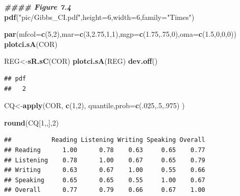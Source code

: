 \documentclass[12pt]{article}
\newenvironment{Shaded}{\begin{snugshade}}{\end{snugshade}}
\newcommand{\AttributeTok}[1]{\textcolor[rgb]{0.13,0.29,0.53}{#1}}
\newcommand{\DecValTok}[1]{\textcolor[rgb]{0.00,0.00,0.81}{#1}}
\newcommand{\DocumentationTok}[1]{\textcolor[rgb]{0.56,0.35,0.01}{\textbf{\textit{#1}}}}
\newcommand{\FloatTok}[1]{\textcolor[rgb]{0.00,0.00,0.81}{#1}}
\newcommand{\FunctionTok}[1]{\textcolor[rgb]{0.13,0.29,0.53}{\textbf{#1}}}
\newcommand{\NormalTok}[1]{#1}
\newcommand{\OtherTok}[1]{\textcolor[rgb]{0.56,0.35,0.01}{#1}}
\newcommand{\StringTok}[1]{\textcolor[rgb]{0.31,0.60,0.02}{#1}}
\begin{document}
\begin{Shaded}
\begin{Highlighting}[]
\DocumentationTok{\#\#\#\# Figure 7.4 }
\FunctionTok{pdf}\NormalTok{(}\StringTok{"pic/Gibbs\_CI.pdf"}\NormalTok{,}\AttributeTok{height=}\DecValTok{6}\NormalTok{,}\AttributeTok{width=}\DecValTok{6}\NormalTok{,}\AttributeTok{family=}\StringTok{"Times"}\NormalTok{)}

\FunctionTok{par}\NormalTok{(}\AttributeTok{mfcol=}\FunctionTok{c}\NormalTok{(}\DecValTok{5}\NormalTok{,}\DecValTok{2}\NormalTok{),}\AttributeTok{mar=}\FunctionTok{c}\NormalTok{(}\DecValTok{3}\NormalTok{,}\FloatTok{2.75}\NormalTok{,}\DecValTok{1}\NormalTok{,}\DecValTok{1}\NormalTok{),}\AttributeTok{mgp=}\FunctionTok{c}\NormalTok{(}\FloatTok{1.75}\NormalTok{,.}\DecValTok{75}\NormalTok{,}\DecValTok{0}\NormalTok{),}\AttributeTok{oma=}\FunctionTok{c}\NormalTok{(}\FloatTok{1.5}\NormalTok{,}\DecValTok{0}\NormalTok{,}\DecValTok{0}\NormalTok{,}\DecValTok{0}\NormalTok{))}
\FunctionTok{plotci.sA}\NormalTok{(COR)}

\NormalTok{REG}\OtherTok{\textless{}{-}}\FunctionTok{sR.sC}\NormalTok{(COR)}
\FunctionTok{plotci.sA}\NormalTok{(REG)}
\FunctionTok{dev.off}\NormalTok{()}
\end{Highlighting}
\end{Shaded}

\begin{verbatim}
## pdf 
##   2
\end{verbatim}

\begin{Shaded}
\begin{Highlighting}[]
\NormalTok{CQ}\OtherTok{\textless{}{-}}\FunctionTok{apply}\NormalTok{(COR, }\FunctionTok{c}\NormalTok{(}\DecValTok{1}\NormalTok{,}\DecValTok{2}\NormalTok{), quantile,}\AttributeTok{prob=}\FunctionTok{c}\NormalTok{(.}\DecValTok{025}\NormalTok{,.}\DecValTok{5}\NormalTok{,.}\DecValTok{975}\NormalTok{) )}

\FunctionTok{round}\NormalTok{(CQ[}\DecValTok{1}\NormalTok{,,],}\DecValTok{2}\NormalTok{)}
\end{Highlighting}
\end{Shaded}

\begin{verbatim}
##           Reading Listening Writing Speaking Overall
## Reading      1.00      0.78    0.63     0.65    0.77
## Listening    0.78      1.00    0.67     0.65    0.79
## Writing      0.63      0.67    1.00     0.55    0.66
## Speaking     0.65      0.65    0.55     1.00    0.67
## Overall      0.77      0.79    0.66     0.67    1.00
\end{verbatim}
\end{document}
